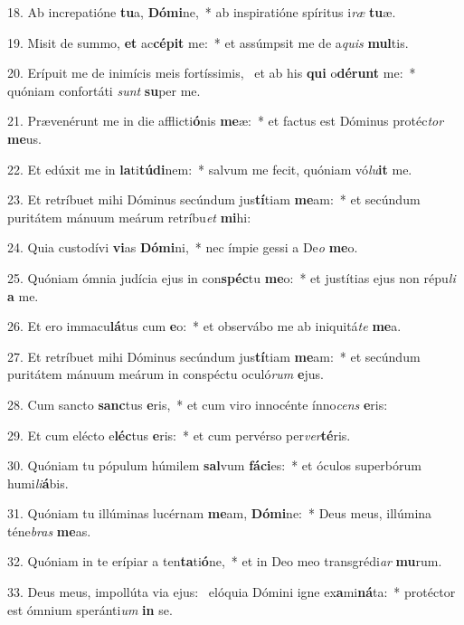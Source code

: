 18. Ab increpatióne \textbf{tu}a, \textbf{Dó}\textbf{mi}ne,~*  ab inspiratióne spíritus i\textit{ræ} \textbf{tu}æ.\

19. Misit de summo, \textbf{et} ac\textbf{cé}\textbf{pit} me:~*  et assúmpsit me de a\textit{quis} \textbf{mul}tis.\

20. Erípuit me de inimícis meis fortíssimis, \dag\  et ab his \textbf{qui} o\textbf{dé}\textbf{runt} me:~*  quóniam confortáti \textit{sunt} \textbf{su}per me.\

21. Prævenérunt me in die afflicti\textbf{ó}nis \textbf{me}æ:~*  et factus est Dóminus protéc\textit{tor} \textbf{me}us.\

22. Et edúxit me in \textbf{la}ti\textbf{tú}\textbf{di}nem:~*  salvum me fecit, quóniam vó\textit{lu}\textbf{it} me.\

23. Et retríbuet mihi Dóminus secúndum jus\textbf{tí}tiam \textbf{me}am:~*  et secúndum puritátem mánuum meárum retríbu\textit{et} \textbf{mi}hi:\

24. Quia custodívi \textbf{vi}as \textbf{Dó}\textbf{mi}ni,~*  nec ímpie gessi a De\textit{o} \textbf{me}o.\

25. Quóniam ómnia judícia ejus in con\textbf{spéc}tu \textbf{me}o:~*  et justítias ejus non répu\textit{li} \textbf{a} me.\

26. Et ero immacu\textbf{lá}tus cum \textbf{e}o:~*  et observábo me ab iniquitá\textit{te} \textbf{me}a.\

27. Et retríbuet mihi Dóminus secúndum jus\textbf{tí}tiam \textbf{me}am:~*  et secúndum puritátem mánuum meárum in conspéctu oculó\textit{rum} \textbf{e}jus.\

28. Cum sancto \textbf{sanc}tus \textbf{e}ris,~*  et cum viro innocénte ínno\textit{cens} \textbf{e}ris:\

29. Et cum elécto e\textbf{léc}tus \textbf{e}ris:~*  et cum pervérso per\textit{ver}\textbf{té}ris.\

30. Quóniam tu pópulum húmilem \textbf{sal}vum \textbf{fá}\textbf{ci}es:~*  et óculos superbórum humi\textit{li}\textbf{á}bis.\

31. Quóniam tu illúminas lucérnam \textbf{me}am, \textbf{Dó}\textbf{mi}ne:~*  Deus meus, illúmina téne\textit{bras} \textbf{me}as.\

32. Quóniam in te erípiar a ten\textbf{ta}ti\textbf{ó}ne,~*  et in Deo meo transgrédi\textit{ar} \textbf{mu}rum.\

33. Deus meus, impollúta via ejus: \dag\  elóquia Dómini igne ex\textbf{a}mi\textbf{ná}ta:~*  protéctor est ómnium speránti\textit{um} \textbf{in} se.\

